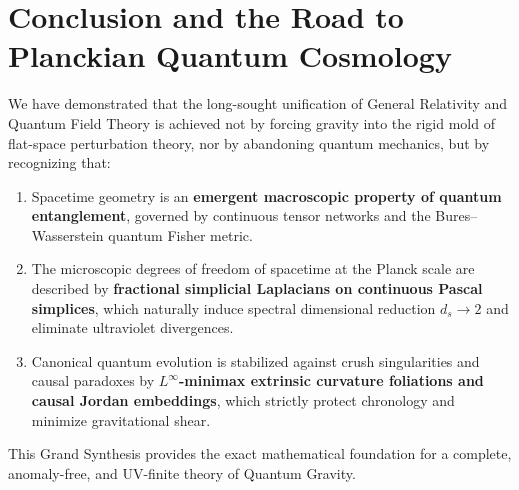 \documentclass[11pt,a4paper,reqno]{amsart}
\theoremstyle{definition}
\numberwithin{equation}{section}
\begin{document}
\section{Conclusion and the Road to Planckian Quantum Cosmology}
\label{sec:conclusion}

We have demonstrated that the long-sought unification of General Relativity and Quantum Field Theory is achieved not by forcing gravity into the rigid mold of flat-space perturbation theory, nor by abandoning quantum mechanics, but by recognizing that:
\begin{enumerate}
    \item Spacetime geometry is an \textbf{emergent macroscopic property of quantum entanglement}, governed by continuous tensor networks and the Bures--Wasserstein quantum Fisher metric.
    \item The microscopic degrees of freedom of spacetime at the Planck scale are described by \textbf{fractional simplicial Laplacians on continuous Pascal simplices}, which naturally induce spectral dimensional reduction $d_s \to 2$ and eliminate ultraviolet divergences.
    \item Canonical quantum evolution is stabilized against crush singularities and causal paradoxes by \textbf{$L^\infty$-minimax extrinsic curvature foliations and causal Jordan embeddings}, which strictly protect chronology and minimize gravitational shear.
\end{enumerate}

This Grand Synthesis provides the exact mathematical foundation for a complete, anomaly-free, and UV-finite theory of Quantum Gravity.
\end{document}
